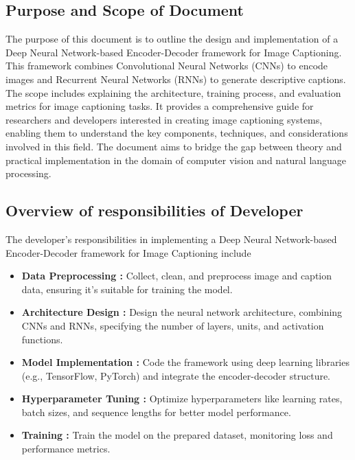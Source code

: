 \documentclass[oneside,a4paper,12pt]{report}
\begin{document}
\subsection{Purpose and Scope of Document}
The purpose of this document is to outline the design and implementation of a Deep Neural Network-based Encoder-Decoder framework for Image Captioning. This framework combines Convolutional Neural Networks (CNNs) to encode images and Recurrent Neural Networks (RNNs) to generate descriptive captions. \\The scope includes explaining the architecture, training process, and evaluation metrics for image captioning tasks. It provides a comprehensive guide for researchers and developers interested in creating image captioning systems, enabling them to understand the key components, techniques, and considerations involved in this field. The document aims to bridge the gap between theory and practical implementation in the domain of computer vision and natural language processing.

\subsection{Overview of responsibilities of Developer}
The developer's responsibilities in implementing a Deep Neural Network-based Encoder-Decoder framework for Image Captioning include
\begin{itemize}


\item \textbf{Data Preprocessing :} Collect, clean, and preprocess image and caption data, ensuring it's suitable for training the model.

\item \textbf{Architecture Design :} Design the neural network architecture, combining CNNs and RNNs, specifying the number of layers, units, and activation functions.

\item \textbf{Model Implementation : }Code the framework using deep learning libraries (e.g., TensorFlow, PyTorch) and integrate the encoder-decoder structure.

\item \textbf{Hyperparameter Tuning : }Optimize hyperparameters like learning rates, batch sizes, and sequence lengths for better model performance.

\item \textbf{Training :} Train the model on the prepared dataset, monitoring loss and performance metrics.
\end{itemize}
  
\end{document}
